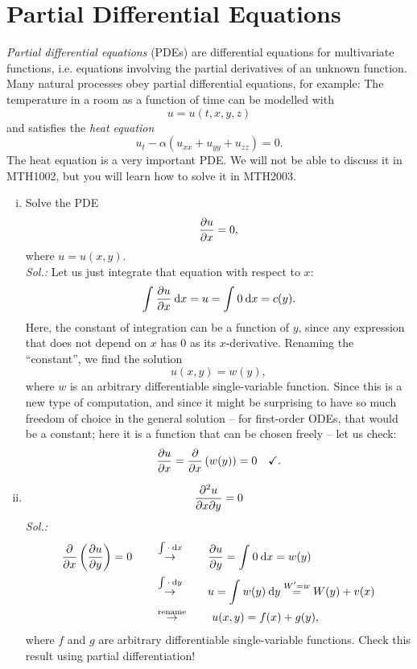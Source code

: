 \section{Partial Differential Equations}
\label{sec:pdes}

\begin{remark}
\emph{Partial differential equations} (PDEs) are differential equations for multivariate functions, i.e. equations involving the partial derivatives of an unknown function. Many natural processes obey partial differential equations, for example: The temperature in a room as a function of time can be modelled with 
\[ u = u(t,x,y,z) \]
and satisfies the \emph{heat equation}
\[ u_t-\alpha\left( u_{xx}+u_{yy}+u_{zz}\right) = 0.\]
The heat equation is a very important PDE. We will not be able to discuss it in MTH1002, but you will learn how to solve it in MTH2003.
\end{remark}

\begin{example}
\begin{enumerate}[(i)]
	\item Solve the PDE \[ \displaystyle{\frac{\partial u}{\partial x}} = 0, \] where $u=u(x,y)$.\\
	{\it Sol.:}
	Let us just integrate that equation with respect to $x$:
	\[ \int_{}^{} \displaystyle{\frac{\partial u}{\partial x}} \: \mathrm{d} x = u = \int_{}^{} 0 \: \mathrm{d} x = c(y). \]
	Here, the constant of integration can be a function of $y$, since any expression that does not depend on $x$ has $0$ as its $x$-derivative. Renaming the ``constant'', we find the solution
	\[ u(x,y) = w(y), \]
	where $w$ is an arbitrary differentiable single-variable function. Since this is a new type of computation, and since it might be surprising to have so much freedom of choice in the general solution -- for first-order ODEs, that would be a constant; here it is a function that can be chosen freely -- let us check: 
	\[ \displaystyle{\frac{\partial u}{\partial x}} = \displaystyle{\frac{\partial }{\partial x}} \left( w(y) \right) = 0 \quad \text{\checkmark}. \]
	\item \[ \displaystyle{\frac{\partial^2 u}{\partial{x}\partial{y}}} = 0 \]
	{\it Sol.:}
	\begin{equation*}
	\begin{split}
	\displaystyle{\frac{\partial }{\partial x}}\left(\displaystyle{\frac{\partial u}{\partial y}}\right) = 0 \qquad & \stackrel{\int_{}^{} \cdot \: \mathrm{d} x}{\rightarrow} \qquad 
	\displaystyle{\frac{\partial u}{\partial y}} = \int_{}^{} 0 \: \mathrm{d} x = w(y) \\
	& \stackrel{\int_{}^{} \cdot \: \mathrm{d} y}{\rightarrow} \qquad u = \int_{}^{} w(y) \: \mathrm{d} y 
	\stackrel{W'=w}{=} W(y) + v(x) \\
	& \stackrel{\text{rename}}{\rightarrow} \qquad u(x,y) = f(x) + g(y),
	\end{split}
	\end{equation*}
	where $f$ and $g$ are arbitrary differentiable single-variable functions. Check this result using partial differentiation!
\end{enumerate}
\end{example}

